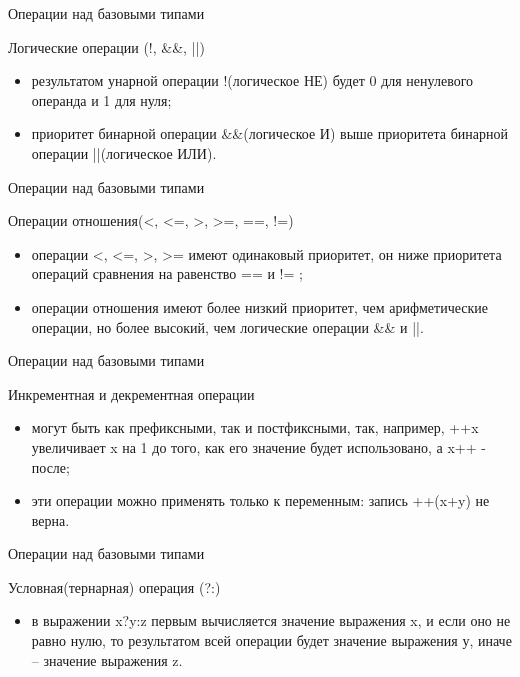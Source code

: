 \documentclass{beamer}
\begin{document}
\begin{frame}{Операции над базовыми типами}
\begin{block}{Логические операции (!, \&\&, ||)}
\begin{itemize}
\item результатом унарной операции !(логическое НЕ) будет 0 для ненулевого операнда и 1 для нуля;
\item приоритет бинарной операции \&\&(логическое И) выше приоритета бинарной операции ||(логическое ИЛИ).
\end{itemize}
\end{block}
\end{frame}

\begin{frame}{Операции над базовыми типами}
\begin{block}{Операции отношения(<, <=, >, >=, ==, !=)}
\begin{itemize}
\item операции <, <=, >, >= имеют одинаковый приоритет, он ниже приоритета операций сравнения на равенство == и != ;
\item операции отношения имеют более низкий приоритет, чем арифметические операции, но более высокий, чем логические операции \&\& и ||.
\end{itemize}
\end{block}
\end{frame}

\begin{frame}{Операции над базовыми типами}
\begin{block}{Инкрементная и декрементная операции}
\begin{itemize}
\item могут быть как префиксными, так и постфиксными, так, например, ++x увеличивает x на 1 до того, как его значение будет использовано, а x++ - после;
\item эти операции можно применять только к переменным: запись ++(x+y) не верна.
\end{itemize}
\end{block}
\end{frame}

\begin{frame}{Операции над базовыми типами}
\begin{block}{Условная(тернарная) операция (?:)}
\begin{itemize}
\item в выражении x?y:z первым вычисляется значение выражения x, и если оно не равно нулю, то результатом всей операции будет значение выражения у, иначе – значение выражения z.
\end{itemize}
\end{block}
\end{frame}
\end{document}
